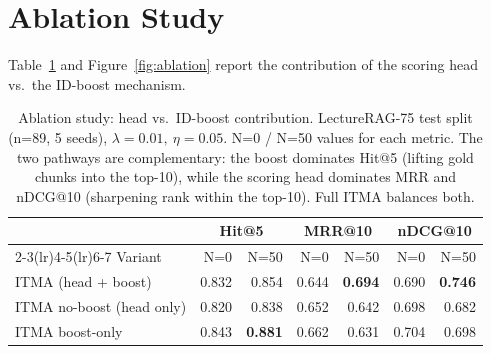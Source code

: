 \documentclass[preprint,12pt]{elsarticle}
\begin{document}
\section{Ablation Study}
\label{sec:ablation}

Table~\ref{tab:ablation} and Figure~\ref{fig:ablation} report the contribution
of the scoring head vs.\ the ID-boost mechanism.

\begin{table}[t]
\centering
\small
\caption{Ablation study: head vs.\ ID-boost contribution.
LectureRAG-75 test split (n=89, 5 seeds), $\lambda{=}0.01,~\eta{=}0.05$.
N=0 / N=50 values for each metric.  The two pathways are complementary:
the boost dominates Hit@5 (lifting gold chunks into the top-10), while the
scoring head dominates MRR and nDCG@10 (sharpening rank within the
top-10).  Full ITMA balances both.}
\label{tab:ablation}
\begin{tabular}{lrrrrrr}
\toprule
                          & \multicolumn{2}{c}{Hit@5} & \multicolumn{2}{c}{MRR@10} & \multicolumn{2}{c}{nDCG@10} \\
\cmidrule(lr){2-3}\cmidrule(lr){4-5}\cmidrule(lr){6-7}
Variant                   & N=0 & N=50 & N=0 & N=50 & N=0 & N=50 \\
\midrule
ITMA (head + boost)       & 0.832 & 0.854 & 0.644 & \textbf{0.694} & 0.690 & \textbf{0.746} \\
ITMA no-boost (head only) & 0.820 & 0.838 & 0.652 & 0.642 & 0.698 & 0.682 \\
ITMA boost-only           & 0.843 & \textbf{0.881} & 0.662 & 0.631 & 0.704 & 0.698 \\
\bottomrule
\end{tabular}
\end{table}
\end{document}
